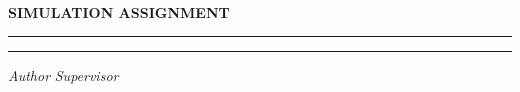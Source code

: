 \renewcommand{\maketitle} {
    \begin{center}
        {\LARGE \bfseries \titleA}
        \vspace{50pt} \\
        {\bfseries SIMULATION ASSIGNMENT}
        \vspace{10pt}
    \end{center}

    \begin{center}
        \rule{\textwidth}{.75pt}
        \vspace{2pt}
    \end{center}

    \begin{center}
        {\huge \bfseries \titleB}
        \vspace{2pt}
    \end{center}

    \begin{center}
        \rule{\textwidth}{.75pt}
        \vspace{30pt}
    \end{center}

    \begin{center}
        \begin{minipage}{.86\textwidth}
            {\large
            \noindent
            \textit{Author}
            \hfill
            \textit{Supervisor}

            \vspace{4pt}

            \noindent
            \bfseries \groupMemberA
            \vspace{2pt}
            \hfill
            \superviser

            \noindent
            \bfseries \groupMemberB
            \vspace{2pt} \\
            \noindent
            \bfseries \groupMemberC
            }
        \end{minipage}
    \end{center}
}

\maketitle

\renewenvironment{abstract} {
    \vspace{40pt}
    \begin{center}
        {\large \bfseries \abstractname}
    \end{center}
    \vspace{4pt}
} {
}

